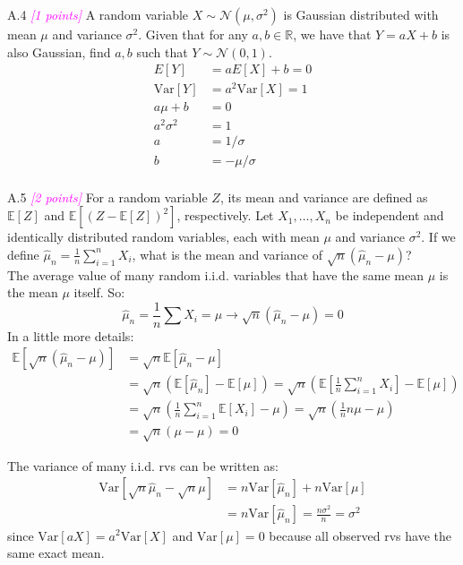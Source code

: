 \documentclass{article}
\newcommand{\field}[1]{\mathbb{#1}}
\newcommand{\1}{\mathbf{1}}
\newcommand{\E}{\mathbb{E}}
\newcommand{\R}{\field{R}} %
\newcommand{\points}[1]{\small\textcolor{magenta}{\emph{[#1 points]}} \normalsize}
\begin{document}
\newpage
A.4 \points{1} A random variable $X \sim \mathcal{N}(\mu, \sigma^2)$ is Gaussian distributed with mean $\mu$ and variance $\sigma^2$. Given that for any $a,b \in \R$, we have that $Y = aX + b$ is also Gaussian, find $a,b$ such that $Y \sim \mathcal{N}(0,1)$.
\begin{align*}
    E[Y] &= aE[X]+b = 0\\
    \text{Var}[Y] &= a^2\text{Var}[X] = 1\\
    a\mu + b &= 0\\
    a^2\sigma^2 &= 1\\
    a &= 1/\sigma\\
    b &= - \mu/\sigma\\
\end{align*}

\newpage
A.5 \points{2} For a random variable $Z$, its mean and variance are defined as $\E[Z]$ and $\E[(Z-\E[Z])^2]$, respectively. Let $X_1,\dots,X_n$ be independent and identically distributed random variables, each with mean $\mu$ and variance $\sigma^2$. If we define $\widehat{\mu}_n = \frac{1}{n} \sum_{i=1}^n X_i$, what is the mean and variance of $\sqrt{n}(\widehat{\mu}_n - \mu)$? \\

The average value of many random i.i.d. variables that have the same mean $\mu$ is the mean $\mu$ itself. So:
$$\hat\mu_n = \frac{1}{n}\sum X_i = \mu \rightarrow \sqrt{n}(\hat\mu_n - \mu) = 0$$
In a little more details: 
\begin{align*}
\E[\sqrt{n}(\hat\mu_n - \mu)] &= \sqrt n \E\left[\hat\mu_n - \mu\right] \\
&=\sqrt n \left(\E[\hat\mu_n] - \E[\mu]\right) = \sqrt n \left(\E\left[\frac{1}{n} \sum_{i=1}^n X_i\right] - \E[\mu]\right)\\
&= \sqrt n \left(\frac{1}{n}\sum_{i=1}^n \E[X_i] - \mu\right) = \sqrt n \left(\frac{1}{n}n\mu - \mu\right) \\
&= \sqrt n (\mu - \mu) = 0
\end{align*}

The variance of many i.i.d. rvs can be written as:
\begin{align*}
    \text{Var}[\sqrt n \hat\mu_n - \sqrt n \mu] &= n\text{Var}[\hat\mu_n]+n\text{Var}[\mu] \\
    &= n \text{Var}[\hat\mu_n] = \frac{n\sigma^2}{n} = \sigma^2
\end{align*}
since $\text{Var}[aX]=a^2\text{Var}[X]$ and $\text{Var}[\mu]=0$ because all observed rvs have the same exact mean.\\
\end{document}
